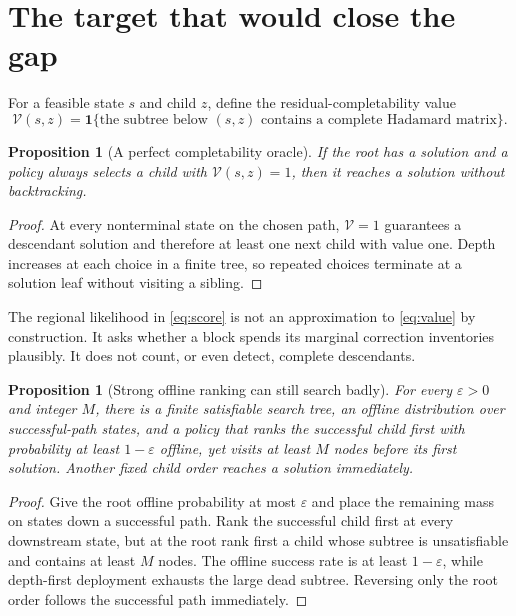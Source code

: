 \documentclass[10pt,twoside]{article}
\theoremstyle{noteplain}
\newtheorem{proposition}[theorem]{Proposition}
\theoremstyle{definition}
\newcommand{\V}{\mathcal{V}}
\begin{document}
\section{The target that would close the gap}

For a feasible state $s$ and child $z$, define the residual-completability value
\begin{equation}\label{eq:value}
\V(s,z)=\mathbf{1}\{\text{the subtree below }(s,z)\text{ contains a complete Hadamard matrix}\}.
\end{equation}

\begin{proposition}[A perfect completability oracle]\label{prop:oracle}
If the root has a solution and a policy always selects a child with $\V(s,z)=1$, then it reaches a solution without backtracking.
\end{proposition}

\begin{proof}
At every nonterminal state on the chosen path, $\V=1$ guarantees a descendant solution and therefore at least one next child with value one.  Depth increases at each choice in a finite tree, so repeated choices terminate at a solution leaf without visiting a sibling.
\end{proof}

The regional likelihood in \eqref{eq:score} is not an approximation to \eqref{eq:value} by construction.  It asks whether a block spends its marginal correction inventories plausibly.  It does not count, or even detect, complete descendants.

\begin{proposition}[Strong offline ranking can still search badly]\label{prop:counterexample}
For every $\varepsilon>0$ and integer $M$, there is a finite satisfiable search tree, an offline distribution over successful-path states, and a policy that ranks the successful child first with probability at least $1-\varepsilon$ offline, yet visits at least $M$ nodes before its first solution.  Another fixed child order reaches a solution immediately.
\end{proposition}

\begin{proof}
Give the root offline probability at most $\varepsilon$ and place the remaining mass on states down a successful path.  Rank the successful child first at every downstream state, but at the root rank first a child whose subtree is unsatisfiable and contains at least $M$ nodes.  The offline success rate is at least $1-\varepsilon$, while depth-first deployment exhausts the large dead subtree.  Reversing only the root order follows the successful path immediately.
\end{proof}
\end{document}
